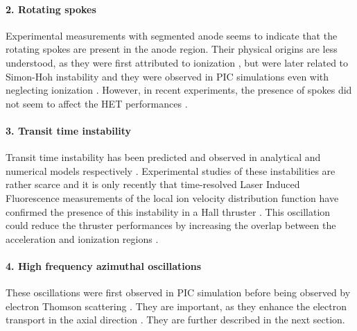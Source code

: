   \paragraph{2. Rotating spokes\\}
  Experimental measurements with segmented anode \citep{ellison2012,mcdonald2011} seems to indicate that the rotating spokes are present in the anode region.
  Their physical origins are less understood, as they were first attributed to ionization \citep{janes1966}, but were later related to Simon-Hoh instability and they were observed in \ac{PIC} simulations even with neglecting ionization \citep{carlsson2018}.
  However, in recent experiments, the presence of spokes did not seem to affect the \ac{HET} performances \citep{boeuf2018}.

  \paragraph{3. Transit time instability\\}
  Transit time instability has been predicted and observed in analytical and numerical models respectively \citep{barral2005,boeuf2018}.
  Experimental studies of these instabilities are rather scarce and it is only recently that time-resolved Laser Induced Fluorescence measurements of the local ion velocity distribution function have confirmed the presence of this instability in a Hall thruster \citep{vaudolon2015}.
  This oscillation could reduce the thruster performances by increasing the overlap between the acceleration and ionization regions \citep{boeuf2018}.

  \paragraph{4. High frequency azimuthal oscillations\\}
  These oscillations were first observed in \ac{PIC} simulation \citep{adam2004,ducrocq2006,adam2008a,heron2013} before being observed by electron Thomson scattering \citep{tsikata2009a,tsikata2009,tsikata2013}.
  They are important, as they enhance the electron transport in the axial direction \citep{adam2004,lafleur2016a}.
  They are further described in the next section.
